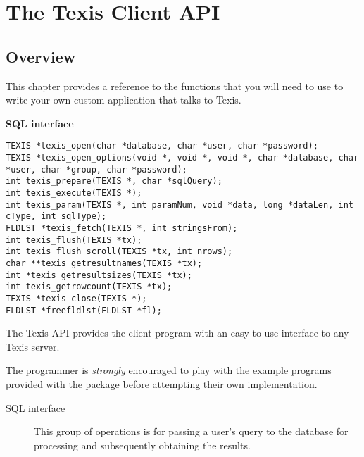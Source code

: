 

\chapter{The Texis Client API}{\label{Part:V:Chp:tcapi}}{\label{Part:V:Chp:Embed}}
\section{Overview}
This chapter provides a reference to the functions that you will need to
use to write your own custom application that talks to Texis.

\SYNOPSIS

{\bf SQL interface}
\begin{verbatim}
TEXIS *texis_open(char *database, char *user, char *password);
TEXIS *texis_open_options(void *, void *, void *, char *database, char *user, char *group, char *password);
int texis_prepare(TEXIS *, char *sqlQuery);
int texis_execute(TEXIS *);
int texis_param(TEXIS *, int paramNum, void *data, long *dataLen, int cType, int sqlType);
FLDLST *texis_fetch(TEXIS *, int stringsFrom);
int texis_flush(TEXIS *tx);
int texis_flush_scroll(TEXIS *tx, int nrows);
char **texis_getresultnames(TEXIS *tx);
int *texis_getresultsizes(TEXIS *tx);
int texis_getrowcount(TEXIS *tx);
TEXIS *texis_close(TEXIS *);
FLDLST *freefldlst(FLDLST *fl);

\end{verbatim}

\DESCRIPTION

The Texis API provides the client program with an easy to use interface to
any Texis server.

The programmer is {\em strongly} encouraged to play with the example
programs provided with the package before attempting their own
implementation.

\begin{description}
\item[SQL interface]

    This group of operations is for passing a user's query to the
    database for processing and subsequently obtaining the results.

\end{description}


